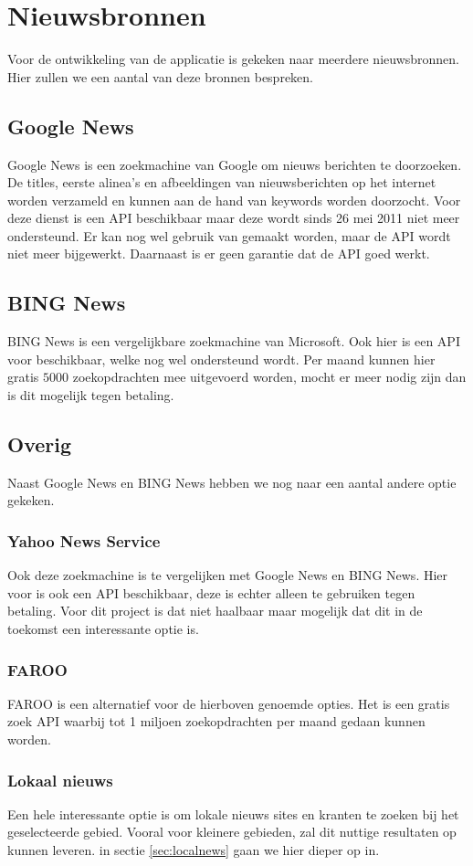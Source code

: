 \documentclass[twoside,openright]{uva-bachelor-thesis}
\begin{document}
	\section{Nieuwsbronnen}
		Voor de ontwikkeling van de applicatie is gekeken naar meerdere nieuwsbronnen. Hier zullen we een aantal van deze bronnen bespreken.
		\subsection{Google News}
			Google News \cite{NewsAPI} is een zoekmachine van Google om nieuws berichten te doorzoeken. De titles, eerste alinea's en afbeeldingen van nieuwsberichten op het internet worden verzameld en kunnen aan de hand van keywords worden doorzocht. Voor deze dienst is een API beschikbaar maar deze wordt sinds 26 mei 2011 niet meer ondersteund. Er kan nog wel gebruik van gemaakt worden, maar de API wordt niet meer bijgewerkt. Daarnaast is er geen garantie dat de API goed werkt. 
		\subsection{BING News}
			BING News \cite{BINGNews} is een vergelijkbare zoekmachine van Microsoft. Ook hier is een API voor beschikbaar, welke nog wel ondersteund wordt. Per maand kunnen hier gratis $5000$ zoekopdrachten mee uitgevoerd worden, mocht er meer nodig zijn dan is dit mogelijk tegen betaling.
		\subsection{Overig}
			Naast Google News en BING News hebben we nog naar een aantal andere optie gekeken.
			\subsubsection{Yahoo News Service}
				Ook deze zoekmachine is te vergelijken met Google News en BING News. Hier voor is ook een API \cite{YahooNews} beschikbaar, deze is echter alleen te gebruiken tegen betaling. Voor dit project is dat niet haalbaar maar mogelijk dat dit in de toekomst een interessante optie is.
			\subsubsection{FAROO}
				FAROO \cite{Faroo} is een alternatief voor de hierboven genoemde opties. Het is een gratis zoek API waarbij tot 1 miljoen zoekopdrachten per maand gedaan kunnen worden. 
			\subsubsection{Lokaal nieuws}
				Een hele interessante optie is om lokale nieuws sites en kranten te zoeken bij het geselecteerde gebied. Vooral voor kleinere gebieden, zal dit nuttige resultaten op kunnen leveren. in sectie \ref{sec:localnews} gaan we hier dieper op in.
\end{document}
